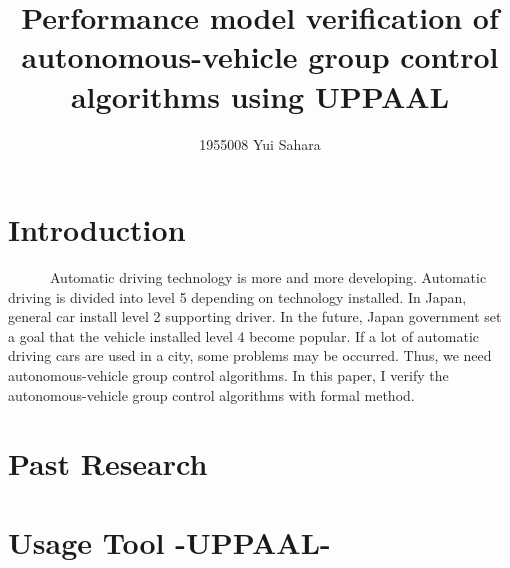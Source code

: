 \documentclass[]{article}
\title{Performance model verification of autonomous-vehicle group control algorithms using UPPAAL }
\author{1955008	Yui Sahara}
\date{}
\begin{document}
\maketitle

\section{Introduction}
　　　Automatic driving technology is more and more developing.  Automatic driving is divided into level  5 depending on technology installed.  In Japan, general car install level 2 supporting driver.  In the future,  Japan government set a goal that the vehicle installed level 4 become popular.  If a lot of automatic driving cars are used in a city, some problems may be occurred.  Thus, we need autonomous-vehicle group control algorithms.  In this paper, I verify the autonomous-vehicle group control algorithms with formal method.
\section{Past Research}
\section{Usage Tool -UPPAAL-}
\begin{thebibliography}{1}
\end{thebibliography}
\end{document}
